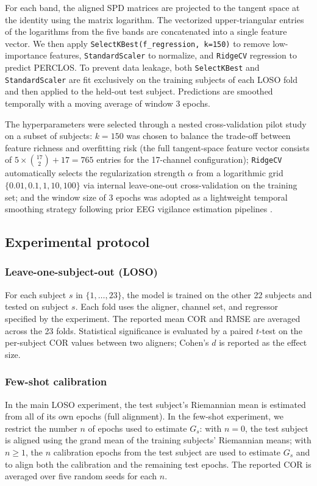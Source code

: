 \documentclass[journal,twoside,web]{ieeecolor2}
\begin{document}
For each band, the aligned SPD matrices are projected to the tangent
space at the identity using the matrix logarithm. The vectorized
upper-triangular entries of the logarithms from the five bands are
concatenated into a single feature vector. We then apply
\texttt{SelectKBest(f\_regression, k=150)} to remove low-importance
features, \texttt{StandardScaler} to normalize, and \texttt{RidgeCV}
regression to predict PERCLOS. To prevent data leakage, both
\texttt{SelectKBest} and \texttt{StandardScaler} are fit exclusively
on the training subjects of each LOSO fold and then applied to the
held-out test subject. Predictions are smoothed
temporally with a moving average of window 3 epochs.

The hyperparameters were selected through a nested cross-validation pilot
study on a subset of subjects: $k=150$ was chosen to balance the
trade-off between feature richness and overfitting risk (the full
tangent-space feature vector consists of $5 \times \binom{17}{2} + 17
= 765$ entries for the 17-channel configuration); \texttt{RidgeCV}
automatically selects the regularization strength $\alpha$ from a
logarithmic grid $\{0.01, 0.1, 1, 10, 100\}$ via internal leave-one-out
cross-validation on the training set; and the window size of 3
epochs was adopted as a lightweight temporal smoothing strategy
following prior EEG vigilance estimation pipelines
\cite{zheng2017,ang2012fbcsp}.

\subsection{Experimental protocol}

\subsubsection{Leave-one-subject-out (LOSO)} For each subject $s$ in
$\{1, \ldots, 23\}$, the model is trained on the other 22 subjects and
tested on subject $s$. Each fold uses the aligner, channel set, and
regressor specified by the experiment. The reported mean COR and RMSE
are averaged across the 23 folds. Statistical significance is
evaluated by a paired $t$-test on the per-subject COR values between
two aligners; Cohen's $d$ is reported as the effect size.

\subsubsection{Few-shot calibration} In the main LOSO experiment,
the test subject's Riemannian mean is estimated from all of its own
epochs (full alignment). In the few-shot experiment, we restrict the
number $n$ of epochs used to estimate $G_s$: with $n=0$, the test
subject is aligned using the grand mean of the training subjects'
Riemannian means; with $n \ge 1$, the $n$ calibration epochs from the
test subject are used to estimate $G_s$ and to align both the
calibration and the remaining test epochs. The reported COR is averaged
over five random seeds for each $n$.
\end{document}

